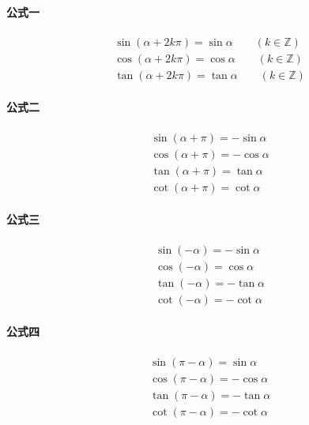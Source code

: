 \documentclass[a4paper, 12pt, draft]{article}
\begin{document}
    \paragraph{公式一}
    \begin{equation}
        \begin{aligned}
            &\sin{(\alpha + 2k\pi)} = \sin{\alpha} \qquad (k \in \mathbb{Z} ) \\
            &\cos{(\alpha + 2k\pi)} = \cos{\alpha} \qquad (k \in \mathbb{Z} ) \\
            &\tan{(\alpha + 2k\pi)} = \tan{\alpha} \qquad (k \in \mathbb{Z} )
        \end{aligned}
    \end{equation}

    \paragraph{公式二}
    \begin{equation}
        \begin{aligned}
            &\sin{(\alpha + \pi)} = -\sin{\alpha} \\
            &\cos{(\alpha + \pi)} = -\cos{\alpha} \\
            &\tan{(\alpha + \pi)} =  \tan{\alpha} \\
            &\cot{(\alpha + \pi)} =  \cot{\alpha}
        \end{aligned}
    \end{equation}

    \paragraph{公式三}
    \begin{equation}
        \begin{aligned}
            &\sin{(-\alpha)} = -\sin{\alpha} \\
            &\cos{(-\alpha)} =  \cos{\alpha} \\
            &\tan{(-\alpha)} =  -\tan{\alpha} \\
            &\cot{(-\alpha)} =  -\cot{\alpha}
        \end{aligned}
    \end{equation}

    \paragraph{公式四}
    \begin{equation}
        \begin{aligned}
            &\sin{(\pi - \alpha)} = \sin{\alpha} \\
            &\cos{(\pi - \alpha)} = -\cos{\alpha} \\
            &\tan{(\pi - \alpha)} = -\tan{\alpha} \\
            &\cot{(\pi - \alpha)} = -\cot{\alpha}
        \end{aligned}
    \end{equation}
\end{document}
